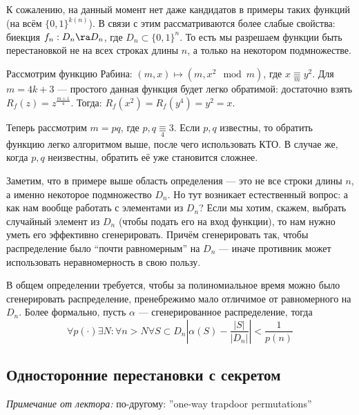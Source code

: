 К сожалению, на данный момент нет даже кандидатов в примеры таких функций (на всём \(\{0, 1\}^{k(n)}\)). В связи с этим рассматриваются более слабые свойства: биекция \(f_n: D_n \ra D_n\), где \(D_n \subset \{0, 1\}^n\). То есть мы разрешаем функции быть перестановкой не на всех строках длины \(n\), а только на некотором подмножестве.

\begin{example}
    Рассмотрим функцию Рабина: \((m, x) \mapsto (m, x^2 \mod m)\), где \(x \underset{m}{\equiv} y^2\). Для \(m = 4k + 3\) --- простого данная функция будет легко обратимой: достаточно взять \(R_f(z) = z^{\frac{m + 1}{4}}\). Тогда: \(R_f(x^2) = R_f(y^4) = y^2 = x\).
    
    Теперь рассмотрим \(m = pq\), где \(p, q \underset{4}{\equiv} 3\). Если \(p, q\) известны, то обратить функцию легко алгоритмом выше, после чего использовать КТО. В случае же, когда \(p, q\) неизвестны, обратить её уже становится сложнее.
\end{example}

Заметим, что в примере выше область определения --- это не все строки длины \(n\), а именно некоторое подмножество \(D_n\). Но тут возникает естественный вопрос: а как нам вообще работать с элементами из \(D_n\)? Если мы хотим, скажем, выбрать случайный элемент из \(D_n\) (чтобы подать его на вход функции), то нам нужно уметь его эффективно сгенерировать. Причём сгенерировать так, чтобы распределение было ``почти равномерным'' на \(D_n\) --- иначе противник может использовать неравномерность в свою пользу.

\begin{definition}
    В общем определении требуется, чтобы за полиномиальное время можно было сгенерировать распределение, пренебрежимо мало отличимое от равномерного на \(D_n\). Более формально, пусть \(\alpha\) --- сгенерированное распределение, тогда
    \[\forall p(\cdot) \exists N: \forall n > N \forall S \subset D_n \left| \alpha(S) - \frac{|S|}{|D_n|}\right| < \frac{1}{p(n)}\]
\end{definition}


\subsection{Односторонние перестановки с секретом}

\textit{Примечание от лектора:} по-другому: ''one-way trapdoor permutations''

